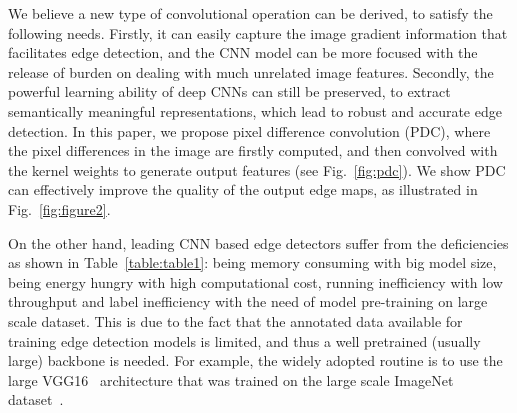 \documentclass[10pt,twocolumn,letterpaper]{article}
\begin{document}
\begin{table}[t!]
\caption{Comparison between ours and some leading edge detection models in terms of efficiency and accuracy. The multiply-accumulates (MACs) are calculated based on a 200$\times$200 image, FPS and ODS \emph{F-measure} are evaluated on the BSDS500 test set.}
\begin{center}
\setlength{\tabcolsep}{0.015\linewidth}
\end{center}
\label{table:table1}
\vspace{-0.2in}
\end{table}

We believe a new type of convolutional operation can be derived, to satisfy the following needs. Firstly, it can easily capture the image gradient information that facilitates edge detection, and the CNN model can be more focused with the release of burden on dealing with much unrelated image features. Secondly, the powerful learning ability of deep CNNs can still be preserved, to extract semantically meaningful representations, which lead to robust and accurate edge detection. In this paper, we propose pixel difference convolution (PDC), where the pixel differences in the image are firstly computed, and then convolved with the kernel weights to generate output features (see Fig.~\ref{fig:pdc}). We show PDC can effectively improve the quality of the output edge maps, as illustrated in Fig.~\ref{fig:figure2}. 

On the other hand, leading CNN based edge detectors suffer from the deficiencies as shown in Table~\ref{table:table1}: being memory consuming with big model size, being energy hungry with high computational cost, running inefficiency with low throughput and label inefficiency with the need of model pre-training on large scale dataset. This is due to the fact that the annotated data available for training edge detection models is limited, and thus a well pretrained (usually large) backbone is needed. For example, the widely adopted routine is to use the large VGG16~\cite{simonyan2014very} architecture that was trained on the large scale ImageNet dataset~\cite{deng2009imagenet}. 
\end{document}
